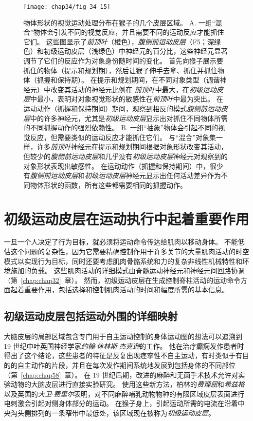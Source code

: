 \begin{figure}[htbp]
	\centering
	\texttt{[image: chap34/fig\_34\_15]}
	\caption{物体形状的视觉运动处理分布在猴子的几个皮层区域\cite{schaffelhofer2016object}。
		A. 一组“混合”物体会引发不同的视觉反应，并且需要不同的运动反应才能抓住它们。
		这些图显示了\textit{前顶叶}（橙色），\textit{腹侧前运动皮层}（F5；深绿色）和初级运动皮层（浅绿色）中神经元的百分比，这些神经元显著调节了它们的反应作为对象身份随时间的变化。
		首先向猴子展示要抓住的物体（提示和规划期），然后让猴子伸手去拿、抓住并抓住物体（抓握和保持期）。
		在提示和规划期间，在不同对象类型（调谐神经元）中改变其活动的神经元比例在 \textit{前顶叶}中最大，在\textit{初级运动皮层}中最小，表明对对象视觉形状的敏感性在\textit{前顶叶}中最为突出。
		在运动动作（抓握和保持期间）期间，观察到相反的模式\textit{腹侧前运动皮层}中的许多神经元，尤其是\textit{初级运动皮层}显示出对抓住不同物体所需的不同抓握动作的强烈依赖性。
		B. 一组“抽象”物体会引起不同的视觉反应，但需要类似的运动反应才能抓住它们。
		与“混合”对象集一样，许多\textit{前顶叶}神经元在提示和规划期间根据对象形状改变其活动，但较少的\textit{腹侧前运动皮层}和几乎没有\textit{初级运动皮层}神经元对观察到的对象形状表现出敏感性。
		在运动动作（抓握和保持期间）中，很少有\textit{腹侧前运动皮层}和\textit{初级运动皮层}神经元显示出任何活动差异作为不同物体形状的函数，所有这些都需要相同的抓握动作。}
	\label{fig:34_15}
\end{figure}



\section{初级运动皮层在运动执行中起着重要作用}

一旦一个人决定了行为目标，就必须将运动命令传达给肌肉以移动身体。
不能低估这个问题的复杂性，因为它需要精确控制作用于许多关节的大量肌肉活动的时空模式以实现行为目标，同时还要考虑肌肉骨骼系统和力的复杂非线性机械特性和环境施加的负载。
这些肌肉活动的详细模式由脊髓运动神经元和神经元间回路协调（第~\ref{chap:chap32}~章）。
然而，初级运动皮层在生成控制脊柱活动的运动命令方面起着重要作用，包括选择和控制肌肉活动的时间和幅度所需的基本信息。



\subsection{初级运动皮层包括运动外围的详细映射}

大脑皮层的局部区域包含专门用于自主运动控制的身体运动图的想法可以追溯到 19 世纪中叶英国神经学家\textit{约翰$\cdot$休林斯$\cdot$杰克逊}的工作。
他在治疗癫痫发作患者时得出了这个结论，这些患者的特征是反复出现痉挛性不自主运动，有时类似于有目的的自主动作的片段，并且在每次发作期间系统地发展到包括身体的不同部位（第~\ref{chap:chap58}~章）。
在 19 世纪后期，改进的麻醉和无菌手术技术允许对实验动物的大脑皮层进行直接实验研究。
使用这些新方法，柏林的\textit{费理屈}和\textit{希兹格}以及英国的\textit{大卫$\cdot$费里尔}表明，对不同麻醉哺乳动物物种的有限区域皮层表面进行电刺激会引起对侧身体部分的运动。
在猴子身上，引起运动所需的电流在沿着中央沟头侧排列的一条窄带中最低处，该区域现在被称为\textit{初级运动皮层}。


